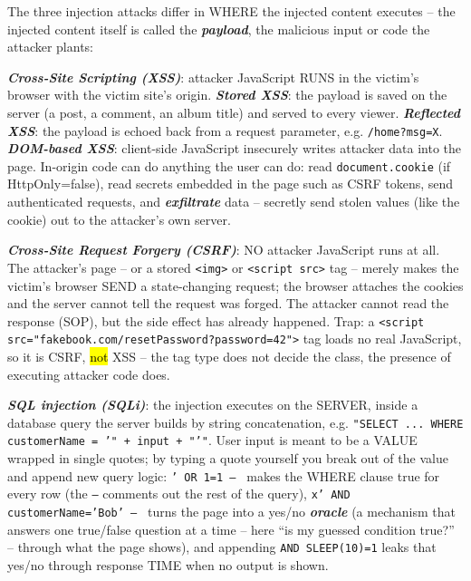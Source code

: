 \documentclass[12pt, a4paper]{article}
\newcommand{\term}[1]{\textbf{\textit{#1}}}        %
\newcommand{\imp}[1]{\hl{#1}}                       %
\begin{document}
The three injection attacks differ in WHERE the injected content executes -- the injected content itself is called the \term{payload}, the malicious input or code the attacker plants:\begin{tightitem}\item \term{Cross-Site Scripting (XSS)}: attacker JavaScript RUNS in the victim's browser with the victim site's origin. \term{Stored XSS}: the payload is saved on the server (a post, a comment, an album title) and served to every viewer. \term{Reflected XSS}: the payload is echoed back from a request parameter, e.g. \texttt{/home?msg=X}. \term{DOM-based XSS}: client-side JavaScript insecurely writes attacker data into the page. In-origin code can do anything the user can do: read \texttt{document.cookie} (if HttpOnly=false), read secrets embedded in the page such as CSRF tokens, send authenticated requests, and \term{exfiltrate} data -- secretly send stolen values (like the cookie) out to the attacker's own server.\item \term{Cross-Site Request Forgery (CSRF)}: NO attacker JavaScript runs at all. The attacker's page -- or a stored \texttt{<img>} or \texttt{<script src>} tag -- merely makes the victim's browser SEND a state-changing request; the browser attaches the cookies and the server cannot tell the request was forged. The attacker cannot read the response (SOP), but the side effect has already happened. Trap: a \texttt{<script src="fakebook.com/resetPassword?password=42">} tag loads no real JavaScript, so it is CSRF, \imp{not} XSS -- the tag type does not decide the class, the presence of executing attacker code does.\item \term{SQL injection (SQLi)}: the injection executes on the SERVER, inside a database query the server builds by string concatenation, e.g. \texttt{"SELECT ... WHERE customerName = '" + input + "'"}. User input is meant to be a VALUE wrapped in single quotes; by typing a quote yourself you break out of the value and append new query logic: \texttt{' OR 1=1 -- } makes the WHERE clause true for every row (the \texttt{--} comments out the rest of the query), \texttt{x' AND customerName='Bob' -- } turns the page into a yes/no \term{oracle} (a mechanism that answers one true/false question at a time -- here ``is my guessed condition true?'' -- through what the page shows), and appending \texttt{AND SLEEP(10)=1} leaks that yes/no through response TIME when no output is shown.\end{tightitem}
\end{document}
